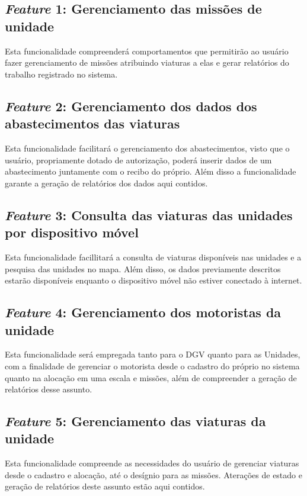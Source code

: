 		\subsection{\textit{Feature} 1: Gerenciamento das missões de unidade}
Esta funcionalidade compreenderá comportamentos que permitirão ao usuário fazer gerenciamento de missões 
atribuindo viaturas a elas e gerar relatórios do trabalho registrado no sistema.
		\subsection{\textit{Feature} 2: Gerenciamento dos dados dos abastecimentos das viaturas}
Esta funcionalidade facilitará o gerenciamento dos abastecimentos, visto que o usuário, propriamente dotado de autorização, 
poderá inserir dados de um abastecimento juntamente com o recibo do próprio. Além disso a funcionalidade garante a 
geração de relatórios dos dados aqui contidos.
		\subsection{\textit{Feature} 3: Consulta das viaturas das unidades por dispositivo móvel}
Esta funcionalidade facillitará a consulta de viaturas disponíveis nas unidades e a pesquisa das unidades no mapa. Além disso, 
os dados previamente descritos estarão disponíveis enquanto o dispositivo móvel não estiver conectado à internet.
		\subsection{\textit{Feature} 4: Gerenciamento dos motoristas da unidade}
Esta funcionalidade será empregada tanto para o DGV quanto para as Unidades, com a finalidade de gerenciar o 
motorista desde o cadastro do próprio no sistema quanto na alocação em uma escala e missões, 
além de compreender a geração de relatórios desse assunto.
		\subsection{\textit{Feature} 5: Gerenciamento das viaturas da unidade}
Esta funcionalidade compreende as necessidades do usuário de gerenciar viaturas desde o cadastro e alocação, 
até o desígnio para as missões. Aterações de estado e geração de relatórios deste assunto estão aqui contidos.

